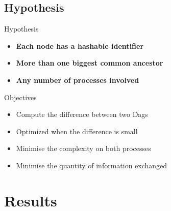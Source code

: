 \documentclass[10pt,xcolor={usenames,dvipsnames,svgnames,table}]{beamer}
\theoremstyle{definition}
\theoremstyle{definition}
\begin{document}
\subsection{Hypothesis}
\begin{frame}

\begin{alertblock}{Hypothesis}
 \begin{itemize}
 \item \textbf{Each node has a hashable identifier}
 \item \textbf{More than one biggest common ancestor}
 \item \textbf{Any number of processes involved}
\end{itemize}
\end{alertblock}

\begin{exampleblock}{Objectives}
 \begin{itemize}
 \item Compute the difference between two Dags
  \item Optimized when the difference is small
  \item Minimise the complexity on both processes
  \item Minimise the quantity of information exchanged
 \end{itemize}
\end{exampleblock}
\end{frame}

\section{Results}
\end{document}
